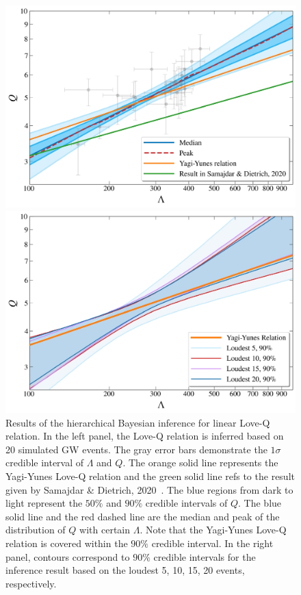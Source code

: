 \documentclass[a4paper,11pt]{article}
\begin{document}
\begin{figure}
\begin{minipage}[t]{0.48\textwidth}
    \includegraphics[width=\textwidth]{hierarchical_results_AP4_2d.pdf}
\end{minipage}
\hfill
\begin{minipage}[t]{0.48\textwidth}
    \includegraphics[width=\textwidth]{2sigma_region.pdf}
\end{minipage}
\caption{Results of the hierarchical Bayesian inference for linear Love-Q relation. 
    In the left panel, the Love-Q relation is inferred based on 20 simulated GW events. 
    The gray error bars demonstrate the $1\sigma$ credible interval of $\Lambda$ and $Q$. 
    The orange solid line represents the Yagi-Yunes Love-Q relation and the green solid line refs to the result given by Samajdar \& Dietrich, 2020~\cite{Samajdar:2020xrd}. 
    The blue regions from dark to light represent the $50\%$ and $90\%$ credible intervals of $Q$. The blue solid line and the red dashed line are the median and peak 
    of the distribution of $Q$ with certain $\Lambda$.
    Note that the Yagi-Yunes Love-Q relation is covered within the $90\%$ credible interval. 
    In the right panel, contours correspond to $90\%$ credible intervals for the inference result based on the loudest 5, 10, 15, 20 events, respectively.
    \label{2-d_Love_Q} }
\end{figure}
\end{document}
